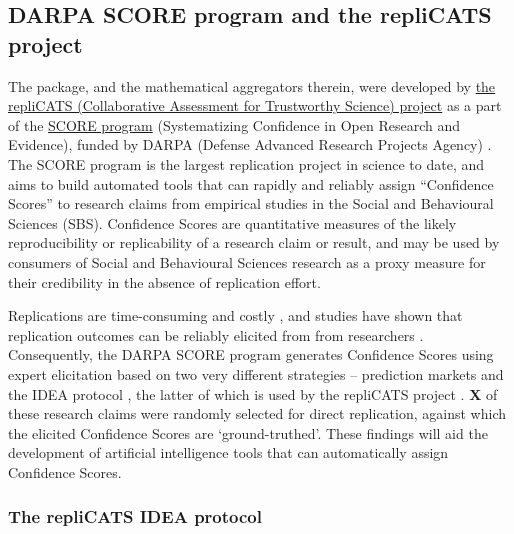 \documentclass[article]{jss}
\begin{document}
\hypertarget{sec-repliCATS}{%
\subsection{DARPA SCORE program and the repliCATS
project}\label{sec-repliCATS}}

The  package, and the mathematical aggregators therein,
were developed by \href{https://replicats.research.unimelb.edu.au/}{the
repliCATS (Collaborative Assessment for Trustworthy Science) project} as
a part of the
\href{https://www.darpa.mil/program/systematizing-confidence-in-open-research-and-evidence}{SCORE
program} (Systematizing Confidence in Open Research and Evidence),
funded by DARPA (Defense Advanced Research Projects Agency)
\citep{alipourfard2021}. The SCORE program is the largest replication
project in science to date, and aims to build automated tools that can
rapidly and reliably assign ``Confidence Scores'' to research claims
from empirical studies in the Social and Behavioural Sciences (SBS).
Confidence Scores are quantitative measures of the likely
reproducibility or replicability of a research claim or result, and may
be used by consumers of Social and Behavioural Sciences research as a
proxy measure for their credibility in the absence of replication
effort.

Replications are time-consuming and costly \citep{Isager2020}, and
studies have shown that replication outcomes can be reliably elicited
from from researchers \citep{Gordon2020}. Consequently, the DARPA SCORE
program generates Confidence Scores using expert elicitation based on
two very different strategies -- prediction markets \citep{Gordon2020}
and the IDEA protocol \citep{hemming2017}, the latter of which is used
by the repliCATS project \citep{Fraser:2021}. \textbf{X} of these
research claims were randomly selected for direct replication, against
which the elicited Confidence Scores are `ground-truthed'. These
findings will aid the development of artificial intelligence tools that
can automatically assign Confidence Scores.

\hypertarget{sec-IDEAprotocol}{%
\subsubsection{The repliCATS IDEA protocol}\label{sec-IDEAprotocol}}
\end{document}
